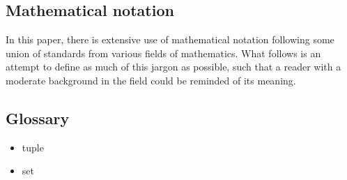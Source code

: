 \documentclass{article}
\newcommand{\braces}[1]{\ensuremath{\left\lbrace #1 \right\rbrace}}
\newcommand{\angles}[1]{\ensuremath{\left\langle #1 \right\rangle}}
\newcommand{\integers}{\ensuremath{\mathbb{Z}}}
\newcommand{\wholes}{\ensuremath{\mathbb{N}}}
\newcommand{\reals}{\ensuremath{\mathbb{R}}}
\renewcommand{\vec}{\boldsymbol}
\newcommand{\abs}[1]{\ensuremath{\left|#1\right|}}
\begin{document}
\appendixpage
\begin{appendix}
\section{Mathematical notation}
\label{sec:notation}
In this paper, there is extensive use of mathematical notation following some union of standards from various fields of mathematics. What follows is an attempt to define as much of this jargon as possible, such that a reader with a moderate background in the field could be reminded of its meaning.


\subsection{Glossary}
\begin{itemize}
\item tuple
\item set
\end{itemize}


\end{appendix}
\end{document}
